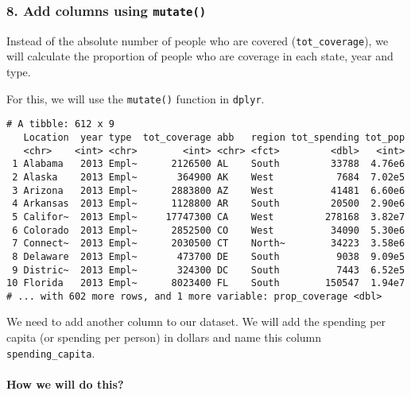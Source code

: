 \documentclass[]{article}
\newenvironment{Shaded}{\begin{snugshade}}{\end{snugshade}}
\newcommand{\DataTypeTok}[1]{\textcolor[rgb]{0.13,0.29,0.53}{#1}}
\newcommand{\KeywordTok}[1]{\textcolor[rgb]{0.13,0.29,0.53}{\textbf{#1}}}
\newcommand{\NormalTok}[1]{#1}
\newcommand{\OperatorTok}[1]{\textcolor[rgb]{0.81,0.36,0.00}{\textbf{#1}}}
\newcommand{\StringTok}[1]{\textcolor[rgb]{0.31,0.60,0.02}{#1}}
\let\oldparagraph\paragraph
\renewcommand{\paragraph}[1]{\oldparagraph{#1}\mbox{}}
\begin{document}
\hypertarget{add-columns-using-mutate}{%
\subsubsection{\texorpdfstring{8. Add columns using
\texttt{mutate()}}{8. Add columns using mutate()}}\label{add-columns-using-mutate}}

Instead of the absolute number of people who are covered
(\texttt{tot\_coverage}), we will calculate the proportion of people who
are coverage in each state, year and type.

For this, we will use the \texttt{mutate()} function in \texttt{dplyr}.

\begin{Shaded}
\end{Shaded}

\begin{verbatim}
# A tibble: 612 x 9
   Location  year type  tot_coverage abb   region tot_spending tot_pop
   <chr>    <int> <chr>        <int> <chr> <fct>         <dbl>   <int>
 1 Alabama   2013 Empl~      2126500 AL    South         33788  4.76e6
 2 Alaska    2013 Empl~       364900 AK    West           7684  7.02e5
 3 Arizona   2013 Empl~      2883800 AZ    West          41481  6.60e6
 4 Arkansas  2013 Empl~      1128800 AR    South         20500  2.90e6
 5 Califor~  2013 Empl~     17747300 CA    West         278168  3.82e7
 6 Colorado  2013 Empl~      2852500 CO    West          34090  5.30e6
 7 Connect~  2013 Empl~      2030500 CT    North~        34223  3.58e6
 8 Delaware  2013 Empl~       473700 DE    South          9038  9.09e5
 9 Distric~  2013 Empl~       324300 DC    South          7443  6.52e5
10 Florida   2013 Empl~      8023400 FL    South        150547  1.94e7
# ... with 602 more rows, and 1 more variable: prop_coverage <dbl>
\end{verbatim}

We need to add another column to our dataset. We will add the spending
per capita (or spending per person) in dollars and name this column
\texttt{spending\_capita}.

\hypertarget{how-we-will-do-this}{%
\paragraph{How we will do this?}\label{how-we-will-do-this}}
\end{document}
